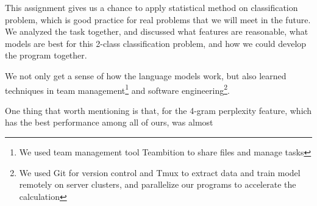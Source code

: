 This assignment gives us a chance to apply statistical method on classification problem, which is good practice 
for real problems that we will meet in the future. We analyzed the task together, and discussed what features
are reasonable, what models are best for this 2-class classification problem, and how we could develop the 
program together. 

We not only get a sense of how the language models work, but also learned techniques in
team management\footnote{We used team management tool Teambition to share files and manage tasks} 
and software engineering\footnote{We used Git for version control and Tmux to extract data and train model
remotely on server clusters, and parallelize our programs to accelerate the calculation}.

One thing that worth mentioning is that, for the 4-gram perplexity feature, which has the best performance among
all of ours, was almost 
